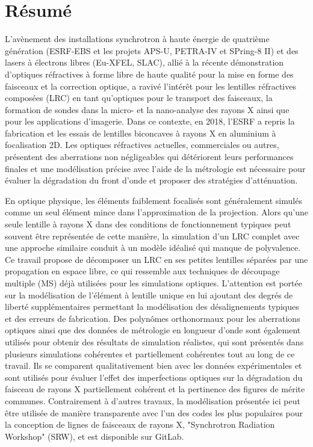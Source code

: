 \chapter*{Résumé}
\label{sec:abstractFR}
\vspace*{-10mm}

L'avènement des installations synchrotron à haute énergie de quatrième génération (ESRF-EBS et les projets APS-U, PETRA-IV et SPring-8 II) et des lasers à électrons libres (Eu-XFEL, SLAC), allié à la récente démonstration d'optiques réfractives à forme libre de haute qualité pour la mise en forme des faisceaux et la correction optique, a ravivé l'intérêt pour les lentilles réfractives composées (LRC) en tant qu'optiques pour le transport des faisceaux, la formation de sondes dans la micro- et la nano-analyse des rayons X ainsi que pour les applications d'imagerie. Dans ce contexte, en 2018, l'ESRF a repris la fabrication et les essais de lentilles biconcaves à rayons X en aluminium à focalisation 2D. Les optiques réfractives actuelles, commerciales ou autres, présentent des aberrations non négligeables qui détériorent leurs performances finales et une modélisation précise avec l'aide de la métrologie est nécessaire pour évaluer la dégradation du front d'onde et proposer des stratégies d'atténuation.

En optique physique, les éléments faiblement focalisés sont généralement simulés comme un seul élément mince dans l'approximation de la projection. Alors qu'une seule lentille à rayons X dans des conditions de fonctionnement typiques peut souvent être représentée de cette manière, la simulation d'un LRC complet avec une approche similaire conduit à un modèle idéalisé qui manque de polyvalence. Ce travail propose de décomposer un LRC en ses petites lentilles séparées par une propagation en espace libre, ce qui ressemble aux techniques de découpage multiple (MS) déjà utilisées pour les simulations optiques. L'attention est portée sur la modélisation de l'élément à lentille unique en lui ajoutant des degrés de liberté supplémentaires permettant la modélisation des désalignements typiques et des erreurs de fabrication. Des polynômes orthonormaux pour les aberrations optiques ainsi que des données de métrologie en longueur d'onde sont également utilisés pour obtenir des résultats de simulation réalistes, qui sont présentés dans plusieurs simulations cohérentes et partiellement cohérentes tout au long de ce travail. Ils se comparent qualitativement bien avec les données expérimentales et sont utilisés pour évaluer l'effet des imperfections optiques sur la dégradation du faisceau de rayons X partiellement cohérent et la pertinence des figures de mérite communes. Contrairement à d'autres travaux, la modélisation présentée ici peut être utilisée de manière transparente avec l'un des codes les plus populaires pour la conception de lignes de faisceaux de rayons X, "Synchrotron Radiation Workshop" (SRW), et est disponible sur GitLab.


